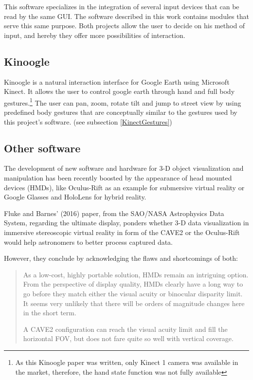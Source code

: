 \documentclass[12pt]{extarticle}
\begin{document}
This software specializes in the integration of several input devices that can be read by the same GUI. The software described in this work contains modules that serve this same purpose. Both projects allow the user to decide on his method of input, and hereby they offer more possibilities of interaction.

\subsection {Kinoogle\cite{Kinoogle}}\label{subsec: kinoogle}
Kinoogle is a natural interaction interface for Google Earth using Microsoft Kinect. It allows the user to control google earth through hand and full body gestures.\footnote{As this Kinoogle paper was written, only Kinect 1 camera was available in the market, therefore, the hand state function was not fully available} The user can pan, zoom, rotate tilt and jump to street view by using predefined body gestures that are conceptually similar to the gestures used by this project's software. (see subsection \ref{KinectGestures})

\subsection {Other software}
The development of new software and hardware for 3-D object visualization and manipulation has been recently boosted by the appearance of head mounted devices (HMDs), like Oculus-Rift as an example for submersive virtual reality or Google Glasses and HoloLens for hybrid reality.

Fluke and Barnes' (2016)\cite{NASA} paper, from the SAO/NASA Astrophysics Data System, regarding the ultimate display, ponders whether 3-D data visualization in immersive stereoscopic virtual reality in form of the CAVE2 or the Oculus-Rift would help astronomers to better process captured data.

However, they conclude by acknowledging the flaws and shortcomings of both:
\begin{quotation}
As a low-cost, highly portable solution, HMDs remain an intriguing option. From the perspective of display quality, HMDs clearly have a long way to go before they match either the visual acuity or binocular disparity limit. It seems very unlikely that there will be orders of magnitude changes here in the short term.

A CAVE2 configuration can reach the visual acuity limit and fill the horizontal FOV, but does not fare quite so well with vertical coverage. \cite{NASA}
\end{quotation}
\end{document}
